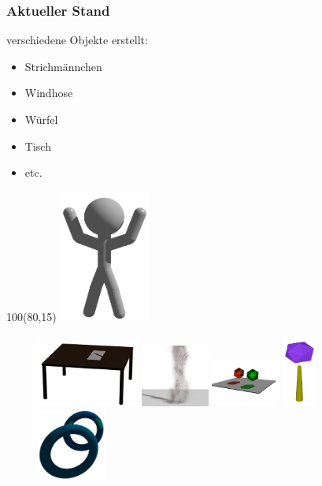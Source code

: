 \documentclass[compress]{beamer}
\begin{document}
\begin{frame}
	\frametitle{Aktueller Stand}
	\vspace{0.5cm}
	verschiedene Objekte erstellt:	
	\begin{itemize}
	  \item Strichmännchen
	  \item Windhose
	  \item Würfel
	  \item Tisch
	  \item etc.
	\end{itemize}
	
	
	\begin{textblock}{100}(80,15)
	  \includegraphics[width=3cm]{pics/maenchen.png}
	\end{textblock}
	\vspace{1.5cm}
	\begin{figure}
		\begin{center}
			\includegraphics[width=0.3\textwidth]{pics/table.png}
			\includegraphics[width=0.2\textwidth]{pics/tornado3.png}
			\includegraphics[width=0.2\textwidth]{pics/rotating_dices08.png}
			\includegraphics[width=0.1\textwidth]{pics/solo_stick.png}
			\includegraphics[width=0.2\textwidth]{pics/texturemapping.png}
		\end{center}
	\end{figure}

\end{frame}
\end{document}

